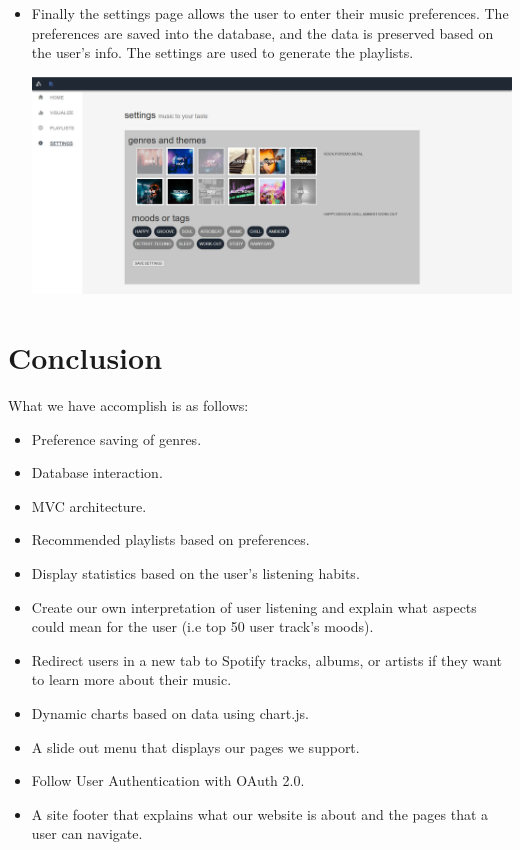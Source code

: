 \documentclass[letter, 11pt]{article}
\begin{document}
\begin{itemize}
    \item Finally the settings page allows the user to enter their music preferences. The preferences are saved into the database, and the data is preserved based on the user's info. The settings are used to generate the playlists.
    
   \includegraphics[scale=0.33,left]{snapshot/Capture5.PNG}
    
\end{itemize}


\section*{Conclusion}

What we have accomplish is as follows:
\begin{itemize}

    \item Preference saving of genres.
    \item Database interaction.
    \item MVC architecture.
    \item Recommended playlists based on preferences.
    \item Display statistics based on the user’s listening habits.
    \item Create our own interpretation of user listening and explain what aspects could mean for the user (i.e top 50 user track’s moods).
    \item Redirect users in a new tab to Spotify tracks, albums, or artists if they want to learn more about their music.
    \item Dynamic charts based on data using chart.js.
    \item A slide out menu that displays our pages we support.
    \item Follow User Authentication with OAuth 2.0.
    \item A site footer that explains what our website is about and the pages that a user can navigate.
\end{itemize}
\end{document}
